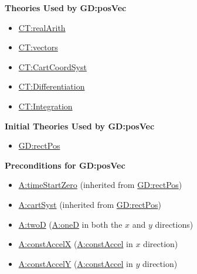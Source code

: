 \documentclass[12pt]{article}
\begin{document}
\noindent \textbf{Theories Used by GD:posVec}

\begin{itemize}
\item \hyperref[CT:realArith]{CT:realArith}
\item \hyperref[CT:vectors]{CT:vectors}
\item \hyperref[CT:CartCoordSyst]{CT:CartCoordSyst}
\item \hyperref[CT:Differentiation]{CT:Differentiation}
\item \hyperref[CT:Integration]{CT:Integration}
\end{itemize}

\noindent \textbf{Initial Theories Used by GD:posVec}

\begin{itemize}
\item \hyperref[GD:rectPos]{GD:rectPos}
\end{itemize}

\noindent \textbf{Preconditions for GD:posVec}
\begin{itemize}
\item \hyperref[timeStartZero]{A:timeStartZero} (inherited from \hyperref[GD:rectPos]{GD:rectPos})
\item \hyperref[cartSyst]{A:cartSyst} (inherited from
\hyperref[GD:rectPos]{GD:rectPos})
\item \hyperref[twoD]{A:twoD} (\hyperref[oneD]{A:oneD} in both the $x$ and $y$ directions)
\item \hyperref[constAccelX]{A:constAccelX} (\hyperref[constAccel]{A:constAccel}
in $x$ direction)
\item \hyperref[constAccelY]{A:constAccelY} (\hyperref[constAccel]{A:constAccel}
in $y$ direction)
\end{itemize}
\end{document}
